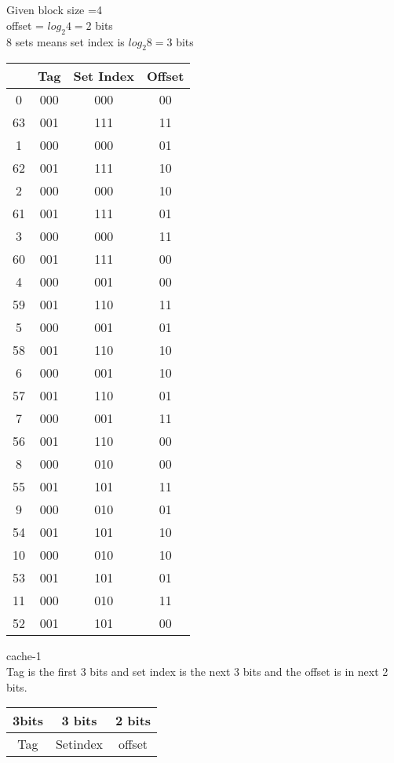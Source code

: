 \documentclass[12pt]{article}
\begin{document}
\section{}
Given block size =4\\
offset = $log_2 4 = 2$ bits\\ 
8 sets means set index is $log_2 8 =3$ bits\\


\begin{center}
	\begin{tabular}{ |c|c|c|c| } 
		\hline
		  & Tag & Set Index  & Offset \\
		  \hline
		0 & 000 & 000 & 00\\
		63&001&111&11\\
	   	1&000&000&01\\
	   	62&001&111&10\\
	   	2&000&000&10\\
	   	61&001&111&01\\
	   	3&000&000&11\\
	   	60&001&111&00\\
	   	4&000&001&00\\
	   	59&001&110&11 \\
	   	5 &000&001&01\\
	   	58 &001&110&10\\
	   	6 &000&001&10\\
	   	57 &001&110&01\\
	   	7 &000&001&11\\
	   	56 &001&110&00\\
	   	8 &000&010&00\\
	   	55 &001&101&11\\
	   	9 &000&010&01\\
	   	54 &001&101&10\\
	   	10&000&010&10\\
	   	53&001&101&01\\
	   	11 &000&010&11\\
	   	52&001&101&00\\
		\hline
	\end{tabular}
\end{center}
 cache-1 \\ 
Tag is the first 3 bits and set index is the next 3 bits and the offset is in next 2 bits.\\


\begin{center}
	\begin{tabular}{ |c|c|c| } 
		\hline
		3bits & 3 bits & 2 bits \\ 
		\hline
		Tag & Setindex & offset \\  
		\hline
	\end{tabular}
\end{center}
\end{document}
